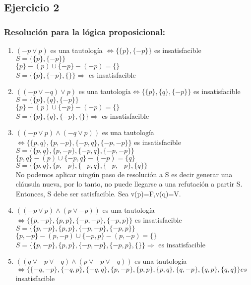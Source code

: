 \documentclass[10pt,a4paper]{article}
\begin{document}
\subsection{Ejercicio 2}
  \subsubsection{Resolución para la lógica proposicional:}
    \begin{enumerate}
        \item $(-p \vee p)$ es una tautología $  \Leftrightarrow \{\{p\},\{-p\}\} $ es insatisfacible \\
        $S=\{\{p\},\{-p\}\}$ \\
        $\{p\}-(p) \cup \{-p\}-(-p)=\{\}$ \\
        $S=\{\{p\},\{-p\},\{\}\} \Rightarrow $ es insatisfacible
        \item $((-p \vee -q) \vee p) $ es una tautología$ \Leftrightarrow \{\{p\},\{q\},\{-p\}\} $ es insatisfacible \\
        $S=\{\{p\},\{q\},\{-p\}\}$ \\
        $\{p\}-(p) \cup \{-p\}-(-p)=\{\}$ \\
        $S=\{\{p\},\{q\},\{-p\},\{\}\} \Rightarrow $ es insatisfacible
        \item $((-p \vee p)\wedge(-q \vee p))$ es una tautología $ \Leftrightarrow \{\{p, q\},\{p, -p\},\{-p, q\},\{-p, -p\}\} $ es insatisfacible \\
        $S=\{\{p, q\},\{p, -p\},\{-p, q\},\{-p, -p\}\}$ \\
        $\{p, q\}-(p) \cup \{-p, q\}-(-p)=\{q\}$ \\
        $S=\{\{p, q\},\{p, -p\},\{-p, q\},\{-p, -p\},\{q\}\}$ \\
        No podemos aplicar ningún paso de resolución a S es decir generar una cláusula nueva, por lo tanto, no puede llegarse a una refutación a partir S. Entonces, S debe ser satisfacible. Sea v(p)=F,v(q)=V.
        \item $((-p \vee p)\wedge(p \vee -p))$ es una tautología $ \Leftrightarrow \{\{p, -p\},\{p, p\},\{-p, -p\},\{-p, p\}\} $ es insatisfacible \\
        $S=\{\{p, -p\},\{p, p\},\{-p, -p\},\{-p, p\}\}$ \\
        $\{p, -p\}-(p,-p) \cup \{-p, p\}-(p,-p)=\{\}$ \\
        $S=\{\{p, -p\},\{p, p\},\{-p, -p\},\{-p, p\},\{\}\} \Rightarrow $ es insatisfacible
        \item $((q \vee -p \vee -q)\wedge(p \vee -p \vee -q))$ es una tautología $ \Leftrightarrow \{\{-q, -p\},\{-q, p\},\{-q, q\},\{p, -p\},\{p, p\},\{p, q\},\{q, -p\},\{q, p\},\{q, q\}\} es$ insatisfacible

\end{enumerate}
\end{document}
